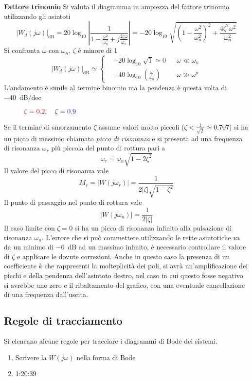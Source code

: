 \newpage
\textbf{Fattore trinomio}
Si valuta il diagramma in ampiezza del fattore trinomio utilizzando gli asintoti
$$
|W_d(j\omega)|_{\si{\deci\bel}} = 20\log_{10} \left|\frac{1}
{1-\frac{\omega^2}{\omega_n^2}+j\frac{2\zeta\omega}{\omega_n}}\right|=
-20\log_{10}\sqrt{
\left(1-\frac{\omega^2}{\omega_n^2}\right)^2+\frac{4\zeta^2\omega^2}
{\omega_n^2} }
$$
Si confronta $\omega$ con $\omega_n$, $\zeta$ è minore di 1
$$
|W_d(j\omega)|_{\si{\deci\bel}} \simeq\left\{
\begin{aligned}
&-20\log_{10}\sqrt{1}\simeq 0 & &\omega\ll\omega_n \\
&-40\log_{10}\left(\frac{\omega}{\omega_n}\right) & & \omega\gg\omega^n
\end{aligned}\right.
$$
L'andamento è simile al termine binomio ma la pendenza è questa volta di
\SI{-40}{\deci\bel/dec}
\begin{figure}[h]
\centering
\def\Wn{10}
\def\zOne{0.2}
\def\K{1}
\def\zTwo{0.9}
\caption{$\textcolor{red}{\zeta=\zOne},\quad \textcolor{blue}{\zeta=\zTwo} $}
\end{figure}

Se il termine di smorzamento $\zeta$ assume valori molto piccoli
($\zeta<\frac{1}{\sqrt{2}}\simeq0.707$) si ha un picco di massimo chiamato
\textit{picco di risonanza} e si presenta ad una frequenza di risonanza
$\omega_r$ più piccola del punto di rottura pari a
$$
\omega_r = \omega_n\sqrt{1-2\zeta^2}
$$
Il valore del picco di risonanza vale
$$
M_r = |W(j\omega_r)| = \frac{1}{2|\zeta|\sqrt{1-\zeta^2}}
$$
Il punto di passaggio nel punto di rottura vale
$$
|W(j\omega_n)| = \frac{1}{2|\zeta|}
$$
Il caso limite con $\zeta=0$ si ha un picco di risonanza infinito alla
pulsazione di risonanza $\omega_n$.
L'errore che si può commettere utilizzando le rette asintotiche va da un minimo
di \SI{-6}{\deci\bel} ad un massimo infinito, è necessario controllare il
valore di $\zeta$ e applicare le dovute correzioni.
Anche in questo caso la presenza di un coefficiente $k$ che rappresenti la
molteplicità dei poli, si avrà un'amplificazione dei picchi e della pendenza
dell'asintoto destro, nel caso in cui questo fosse negativo si avrebbe uno zero
e il ribaltamento del grafico, con una eventuale cancellazione di una frequenza
dall'uscita.

\newpage
\subsection{Regole di tracciamento}
Si elencano alcune regole per tracciare i diagrammi di Bode dei sistemi.
\begin{enumerate}
\item Scrivere la $W(j\omega)$ nella forma di Bode
\item 1:20:39
\end{enumerate}
